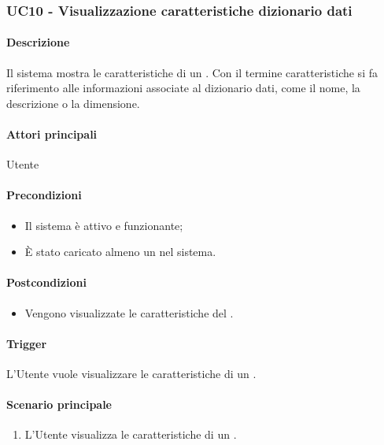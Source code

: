 \subsubsection{UC10 - Visualizzazione caratteristiche dizionario dati}\label{UC10}
\paragraph*{Descrizione}
Il sistema mostra le caratteristiche di un . Con il termine caratteristiche si fa riferimento alle informazioni associate al dizionario dati, come il nome, la descrizione o la dimensione.

\paragraph*{Attori principali}
Utente

\paragraph*{Precondizioni}
\begin{itemize}
  \item Il sistema è attivo e funzionante;
  \item È stato caricato almeno un  nel sistema.  
\end{itemize}

\paragraph*{Postcondizioni}
\begin{itemize}
  \item Vengono visualizzate le caratteristiche del .
\end{itemize}

\paragraph*{Trigger}
L'Utente vuole visualizzare le caratteristiche di un .

\paragraph*{Scenario principale}
\begin{enumerate}
  \item L'Utente visualizza le caratteristiche di un .
\end{enumerate}

